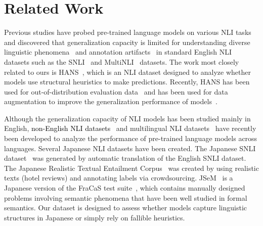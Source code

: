 \documentclass[11pt]{article}
\newcommand{\todo}[1]{\textcolor{black}{#1}}
\begin{document}
\section{Related Work}
\label{sec:related}
Previous studies have probed pre-trained language models on various NLI tasks and discovered that generalization capacity is limited for understanding diverse linguistic phenomena~\cite{naik-etal-2018-stress,glockner-etal-2018-breaking,mccoy-etal-2019-right,rozen-etal-2019-diversify,goodwin-etal-2020-probing,yanaka-etal-2020-neural,hu-etal-2021-investigating,yanaka-etal-2021-exploring} and annotation artifacts~\cite{gururangan-etal-2018-annotation} in standard English NLI datasets such as the SNLI~\cite{bowman-etal-2015-large} and MultiNLI~\cite{williams-etal-2018-broad} datasets.
The work most closely related to ours is HANS~\cite{mccoy-etal-2019-right}, which is an NLI dataset designed to analyze whether models use structural heuristics to make predictions. 
Recently, HANS has been used for out-of-distribution evaluation data~\cite{utama-etal-2020-mind,10.1162/tacl_a_00335,yaghoobzadeh-etal-2021-increasing,du-etal-2021-towards} and has been used for data augmentation to improve the generalization performance of models~\cite{min-etal-2020-syntactic}.

Although the generalization capacity of NLI models has been studied mainly in English, \todo{non-English NLI datasets}~\cite{ham-etal-2020-kornli,hu-etal-2020-ocnli,wijnholds2021sicknl} and multilingual NLI datasets~\cite{conneau-etal-2018-xnli}
have recently been developed to analyze the performance of pre-trained language models across languages.
Several Japanese NLI datasets have been created.
The Japanese SNLI dataset~\cite{jsnli} was generated by automatic translation of the English SNLI dataset.
The Japanese Realistic Textual Entailment Corpus~\cite{hayashibe-2020-japanese} was created by using realistic texts (hotel reviews) and annotating labels via crowdsourcing.
JSeM~\cite{10.1007/978-3-319-50953-2_5} is a Japanese version of the FraCaS test suite~\cite{cooper1994fracas}, which contains manually designed problems involving semantic phenomena that have been well studied in formal semantics.
Our dataset is designed to assess whether models capture
linguistic structures in Japanese or simply rely on fallible heuristics.
\end{document}
